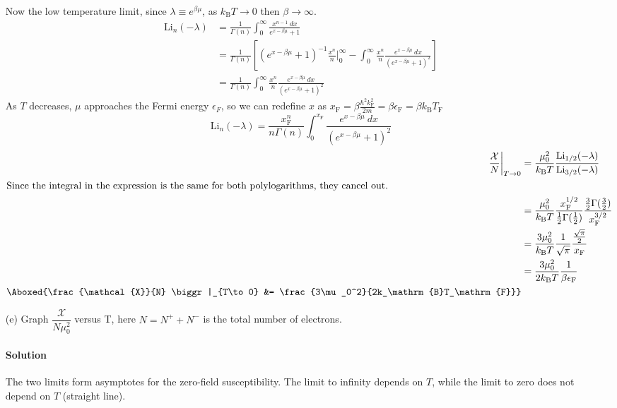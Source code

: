 \documentclass{article}
\begin{document}
\begin{enumerate}
		Now the low temperature limit, since $\lambda \equiv e^{\beta\mu}$, as $k_\mathrm{B}T \to 0$ then $\beta \to \infty$.
		\begin{align}
			\mathrm{Li}_n(-\lambda) &= \frac{1}{\Gamma(n)} \int_{0}^{\infty} \frac{x^{n-1} \ dx}{e^{x-\beta\mu} + 1} \\
			&= \frac{1}{\Gamma(n)} \left[ \left( e^{x-\beta\mu} + 1 \right)^{-1} \frac{x^n}{n} \biggr|_0^\infty - \int_{0}^{\infty} \frac{x^n}{n} \frac{e^{x-\beta\mu} \ dx}{\left( e^{x-\beta\mu} + 1 \right)^2}  \right] \\
			&= \frac{1}{\Gamma(n)} \int_{0}^{\infty} \frac{x^n}{n} \frac{e^{x-\beta\mu} \ dx}{\left( e^{x-\beta\mu} + 1 \right)^2}
		\end{align}
		As $T$ decreases, $\mu$ approaches the Fermi energy $\epsilon_F$, so we can redefine $x$ as $x_\mathrm{F} = \beta \frac{\hbar^2 k_\mathrm{F}^2}{2m} = \beta \epsilon_\mathrm{F} = \beta k_\mathrm{B} T_\mathrm{F}$
		\begin{equation}
			\mathrm{Li}_n(-\lambda) = \frac{x^n_\mathrm{F}}{n\Gamma(n)} \int_{0}^{x_\mathrm{F}} \frac{e^{x-\beta\mu} \ dx}{\left( e^{x-\beta\mu} + 1 \right)^2}
		\end{equation}
		\begin{align}
			\frac{\mathcal{X}}{N} \biggr|_{T\to0} &= \frac{\mu_0^2}{k_\mathrm{B}T} \frac{\mathrm{Li}_{1/2}(-\lambda)}{\mathrm{Li}_{3/2}(-\lambda)} \\
			\intertext{Since the integral in the expression is the same for both polylogarithms, they cancel out.}
			&= \frac{\mu_0^2}{k_\mathrm{B}T} \frac{x^{1/2}_\mathrm{F}}{\tfrac{1}{2}\Gamma(\frac{1}{2})} \frac{\tfrac{3}{2}\Gamma(\tfrac{3}{2})}{x^{3/2}_\mathrm{F}} \\
			&= \frac{3\mu_0^2}{k_\mathrm{B}T} \frac{1}{\sqrt{\pi}} \frac{\tfrac{\sqrt{\pi}}{2}}{x_\mathrm{F}} \\
			&= \frac{3\mu_0^2}{2k_\mathrm{B}T} \frac{1}{\beta \epsilon_\mathrm{F}} \\
			\Aboxed{\frac{\mathcal{X}}{N} \biggr|_{T\to0} &= \frac{3\mu_0^2}{2k_\mathrm{B}T_\mathrm{F}}} 
		\end{align}
		
\clearpage
		
		\item[(e)] Graph $\dfrac{\mathcal{X}}{N \mu_0^2}$ versus T, here $N = N^+ + N^-$ is the total number of electrons.
		\paragraph{Solution} The two limits form asymptotes for the zero-field susceptibility. The limit to infinity depends on $T$, while the limit to zero does not depend on $T$ (straight line).
	\end{enumerate}
	
\end{document}

